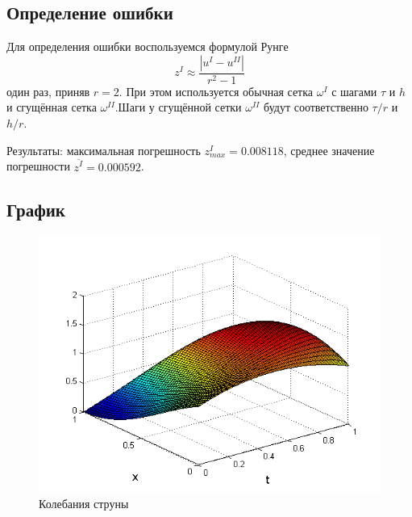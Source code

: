 \documentclass[titlepage,12pt]{article}
\begin{document}
\subsection{Определение ошибки}
Для определения ошибки воспользуемся формулой Рунге 
$$
z^I \approx \frac{|u^I - u^{II}|}{r^2-1}
$$
один раз, приняв $r=2$. При этом используется обычная сетка $\omega^I$ с шагами $\tau$ и $h$ и сгущённая сетка $\omega^{II}$.Шаги у сгущённой сетки $\omega^{II}$ будут соответственно $\tau / r$ и $h/r$.\par
Результаты: максимальная погрешность  $z^I_{max} = 0.008118$, среднее значение погрешности $\overline{z^I} = 0.000592$.

\newpage
\subsection{График}
\begin{figure}[h]
\centering
\includegraphics[width = 16cm]{Screen}
\caption{Колебания струны}
\label{fig:res}	
\end{figure}
\end{document}
